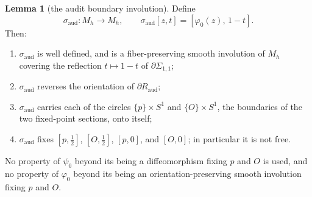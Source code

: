 \documentclass[11pt]{article}
\theoremstyle{definition}
\newtheorem{lemma}[theorem]{Lemma}
\begin{document}
\begin{lemma}[the audit boundary involution]\label{lem:sigma-aud}
Define
\[
 \sigma_{\mathrm{aud}}\colon M_h\to M_h,\qquad
 \sigma_{\mathrm{aud}}[z,t]=[\varphi_0(z),\,1-t].
\]
Then:
\begin{enumerate}
\item[(i)] $\sigma_{\mathrm{aud}}$ is well defined, and is a
 fiber-preserving smooth involution of $M_h$ covering the reflection
 $t\mapsto 1-t$ of $\partial\Sigma_{1,1}$;
\item[(ii)] $\sigma_{\mathrm{aud}}$ reverses the orientation of
 $\partial R_{\mathrm{aud}}$;
\item[(iii)] $\sigma_{\mathrm{aud}}$ carries each of the circles
 $\{p\}\times S^1$ and $\{O\}\times S^1$, the boundaries of the two
 fixed-point sections, onto itself;
\item[(iv)] $\sigma_{\mathrm{aud}}$ fixes $[p,\tfrac12]$, $[O,\tfrac12]$,
 $[p,0]$, and $[O,0]$; in particular it is not free.
\end{enumerate}
No property of $\psi_0$ beyond its being a diffeomorphism fixing $p$ and $O$
is used, and no property of $\varphi_0$ beyond its being an
orientation-preserving smooth involution fixing $p$ and $O$.
\end{lemma}
\end{document}
